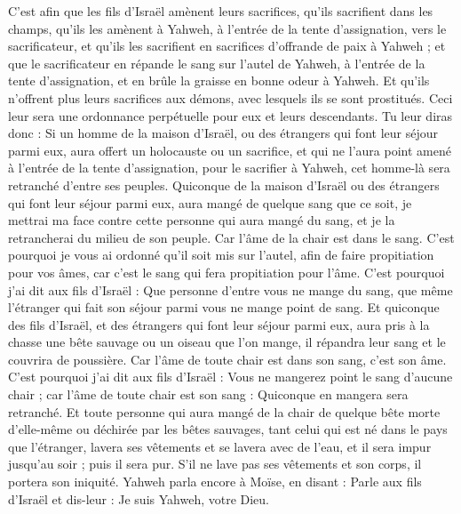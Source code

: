 \begin{multicols}{2}
C'est afin que les fils d'Israël amènent leurs sacrifices, qu'ils sacrifient dans les champs, qu'ils les amènent à Yahweh, à l'entrée de la tente d'assignation, vers le sacrificateur, et qu'ils les sacrifient en sacrifices d'offrande de paix à Yahweh ;
et que le sacrificateur en répande le sang sur l'autel de Yahweh, à l'entrée de la tente d'assignation, et en brûle la graisse en bonne odeur à Yahweh.
Et qu'ils n'offrent plus leurs sacrifices aux démons, avec lesquels ils se sont prostitués. Ceci leur sera une ordonnance perpétuelle pour eux et leurs descendants.
Tu leur diras donc : Si un homme de la maison d'Israël, ou des étrangers qui font leur séjour parmi eux, aura offert un holocauste ou un sacrifice,
et qui ne l'aura point amené à l'entrée de la tente d'assignation, pour le sacrifier à Yahweh, cet homme-là sera retranché d'entre ses peuples.
Quiconque de la maison d'Israël ou des étrangers qui font leur séjour parmi eux, aura mangé de quelque sang que ce soit, je mettrai ma face contre cette personne qui aura mangé du sang, et je la retrancherai du milieu de son peuple.
Car l'âme de la chair est dans le sang. C'est pourquoi je vous ai ordonné qu'il soit mis sur l'autel, afin de faire propitiation pour vos âmes, car c'est le sang qui fera propitiation pour l'âme.
C'est pourquoi j'ai dit aux fils d'Israël : Que personne d'entre vous ne mange du sang, que même l'étranger qui fait son séjour parmi vous ne mange point de sang.
Et quiconque des fils d'Israël, et des étrangers qui font leur séjour parmi eux, aura pris à la chasse une bête sauvage ou un oiseau que l'on mange, il répandra leur sang et le couvrira de poussière.
Car l'âme de toute chair est dans son sang, c'est son âme. C'est pourquoi j'ai dit aux fils d'Israël : Vous ne mangerez point le sang d'aucune chair ; car l'âme de toute chair est son sang : Quiconque en mangera sera retranché.
Et toute personne qui aura mangé de la chair de quelque bête morte d'elle-même ou déchirée par les bêtes sauvages, tant celui qui est né dans le pays que l'étranger, lavera ses vêtements et se lavera avec de l'eau, et il sera impur jusqu'au soir ; puis il sera pur.
S'il ne lave pas ses vêtements et son corps, il portera son iniquité.
\VerseOne{}Yahweh parla encore à Moïse, en disant :
Parle aux fils d'Israël et dis-leur : Je suis Yahweh, votre Dieu.

\end{multicols}
